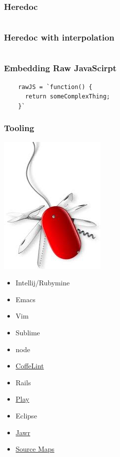 \documentclass{beamer}
\begin{document}
\begin{frame}
  \frametitle{Heredoc}
  \inputminted{coffeescript}{src/heredoc.coffee}
\end{frame}

\begin{frame}
  \frametitle{Heredoc with interpolation}
  \inputminted{coffeescript}{src/heredoc_interp.coffee}
\end{frame}

\begin{frame}[fragile]
  \frametitle{Embedding Raw JavaScirpt}
  \begin{verbatim}
    rawJS = `function() {
      return someComplexThing;
    }`
  \end{verbatim}
\end{frame}


\begin{frame}
  \frametitle{Tooling}
    \includegraphics[scale=.40]{tooling}
  \begin{multicols}{2}
  \begin{itemize}
    \item Intellij/Rubymine
    \item Emacs
    \item Vim
    \item Sublime
    \item node
    \item \href{http://www.coffeelint.org/}{CoffeLint}
    \item Rails
    \item \href{http://www.playframework.com/documentation/2.0/AssetsCoffeeScript}{Play}
    \item Eclipse
    \item \href{https://jawr.java.net/}{Jawr}
    \item
      \href{http://www.html5rocks.com/en/tutorials/developertools/sourcemaps/}{Source
      Maps}

  \end{itemize}
\end{multicols}
\end{frame}
\end{document}
